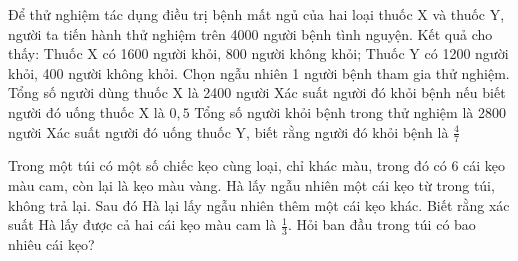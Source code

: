 \begin{vd} %
    Để thử nghiệm tác dụng điều trị bệnh mất ngủ của hai loại thuốc X và thuốc Y, người ta tiến hành thử nghiệm trên 4000 người bệnh tình nguyện. Kết quả cho thấy: Thuốc X có 1600 người khỏi, 800 người không khỏi; Thuốc Y có 1200 người khỏi, 400 người không khỏi. Chọn ngẫu nhiên 1 người bệnh tham gia thử nghiệm.
    \choiceTF
    {\True Tổng số người dùng thuốc X là 2400 người}
    { Xác suất người đó khỏi bệnh nếu biết người đó uống thuốc X là $0,5$}
    {\True Tổng số người khỏi bệnh trong thử nghiệm là 2800 người}
    { Xác suất người đó uống thuốc Y, biết rằng người đó khỏi bệnh là $\frac{4}{7}$}
\end{vd}
\begin{vd} %
    Trong một túi có một số chiếc kẹo cùng loại, chỉ khác màu, trong đó có 6 cái kẹo màu cam, còn lại là kẹo màu vàng. Hà lấy ngẫu nhiên một cái kẹo từ trong túi, không trả lại. Sau đó Hà lại lấy ngẫu nhiên thêm một cái kẹo khác. Biết rằng xác suất Hà lấy được cả hai cái kẹo màu cam là $\frac{1}{3}$. Hỏi ban đầu trong túi có bao nhiêu cái kẹo?
\end{vd}
